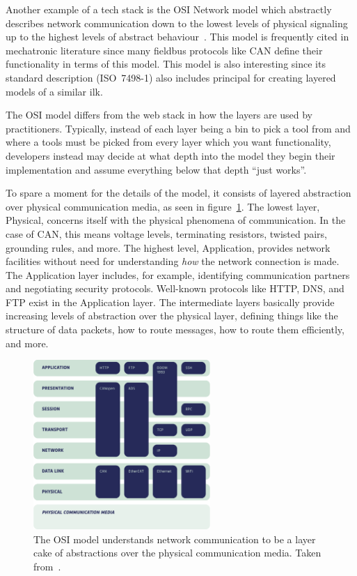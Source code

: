 \documentclass[english,12pt,a4paper,pdftex,eng,utf8]{aaltothesis}
\begin{document}
Another example of a tech stack is the OSI Network model which abstractly describes network communication down to the lowest levels of physical signaling up to the highest levels of abstract behaviour~\cite{ISO7498-1}.  This model is frequently cited in mechatronic literature since many fieldbus protocols like CAN define their functionality in terms of this model.  This model is also interesting since its standard description (ISO~7498-1) also includes principal for creating layered models of a similar ilk.

The OSI model differs from the web stack in how the layers are used by practitioners.  Typically, instead of each layer being a bin to pick a tool from and where a tools must be picked from every layer which you want functionality, developers instead may decide at what depth into the model they begin their implementation and assume everything below that depth ``just works''.

To spare a moment for the details of the model, it consists of layered abstraction over physical communication media, as seen in figure~\ref{fig:osi_model}.  The lowest layer, Physical, concerns itself with the physical phenomena of communication.  In the case of CAN, this means voltage levels, terminating resistors, twisted pairs, grounding rules, and more.  The highest level, Application, provides network facilities without need for understanding {\it how\/} the network connection is made.  The Application layer includes, for example, identifying communication partners and negotiating security protocols.  Well-known protocols like HTTP, DNS, and FTP exist in the Application layer.  The intermediate layers basically provide increasing levels of abstraction over the physical layer, defining things like the structure of data packets, how to route messages, how to route them efficiently, and more.

\begin{figure}[h]
  \centering
  \includegraphics[width=0.6\textwidth]{assets/osi_model}
  \caption{The OSI model understands network communication to be a layer cake of abstractions over the physical communication media.  Taken from~\cite[§6.1.3]{ISO7498-1}.}\label{fig:osi_model}
\end{figure}
\end{document}
